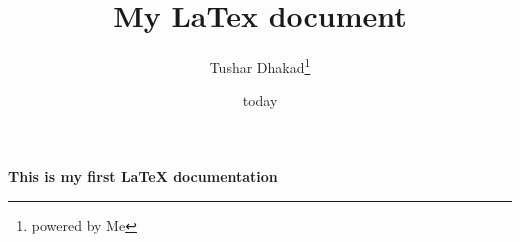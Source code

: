 \documentclass[12pt,letter papper]{article}
\title{My LaTex document}
\author{Tushar Dhakad\thanks{powered by Me}}
\date{today}
\begin{document}
\maketitle
	\textbf{This is my first LaTeX documentation}
\end{document}
